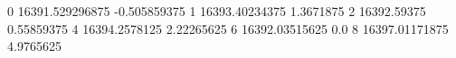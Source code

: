 0 16391.529296875 -0.505859375
1 16393.40234375 1.3671875
2 16392.59375 0.55859375
4 16394.2578125 2.22265625
6 16392.03515625 0.0
8 16397.01171875 4.9765625
